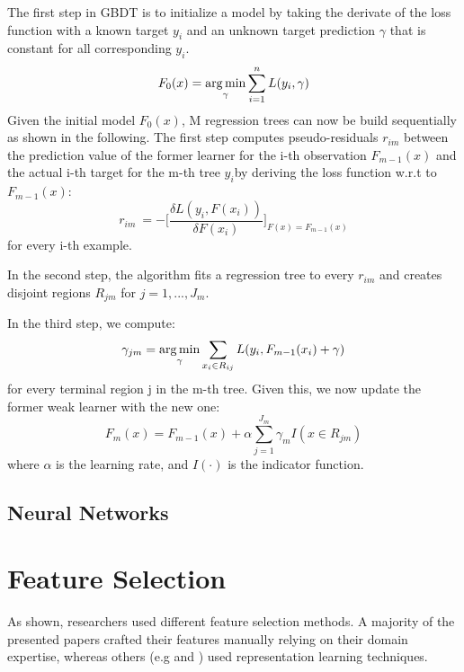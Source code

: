 The first step in GBDT is to initialize a model by taking the derivate of the loss function with a known target $ y_i $ and an unknown target prediction $ \gamma $ that is constant for all corresponding $ y_i $.
\begin{equation}
F_{0}(x) =  \operatorname*{arg\,min}_{\gamma} \sum_{i=1}^n L(y_i,\gamma) \label{gbdt_step1}
\end{equation}
Given the initial model $ F_0(x) $, M regression trees can now be build sequentially as shown in the following. 
The first step computes pseudo-residuals $ r_{im} $ between the prediction value of the former learner for the i-th observation $ F_{m-1}(x) $ and the actual i-th target for the m-th tree $ y_i $by deriving the loss function w.r.t to $ F_{m-1}(x) $: 
\begin{equation}
	r_{im}\ = - \bigg[\dfrac{\delta L(y_i, F(x_i))}{\delta F(x_i)}\bigg]_{F(x) = F_{m-1}(x)}
\end{equation} 
for every i-th example.

In the second step, the algorithm fits a regression tree to every $ r_{im} $ and creates disjoint regions $ R_{jm} $ for $j = 1, ..., J_m$. 

In the third step, we compute: 
\begin{equation}
	\gamma_{jm} = \operatorname*{arg\,min}_{\gamma} \sum_{x_i \in R_{ij}} L(y_i, F_{m-1}(x_i) + \gamma)
\end{equation}
for every terminal region j in the m-th tree. 
Given this, we now update the former weak learner with the new one:
\begin{equation}
	F_m(x) = F_{m-1}(x) + \alpha \sum_{j=1}^{J_m} \gamma_{m}I(x \in R_{jm})
\end{equation}
where $ \alpha $ is the learning rate, and $ I(\cdot) $ is the indicator function.

\subsection{Neural Networks}

\section{Feature Selection}

As shown, researchers used different feature selection methods. A majority of the presented papers crafted their features manually relying on their domain expertise, whereas others (e.g \cite{Siripanpornchana2016_AnnWithDbnFS} and \cite{Huang2018_GBDT}) used representation learning techniques.


